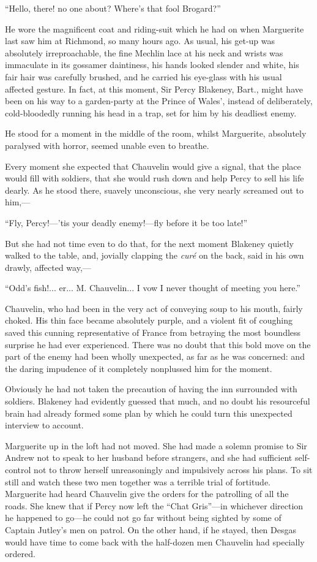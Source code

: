 \documentclass[paper=a5,BCOR=7mm,twoside,DIV=calc,12pt,usegeometry,chapterprefix,endperiod,headings=big]{scrbook}
\begin{document}
\enquote{Hello, there! no one about? Where's that fool Brogard?}

He wore the magnificent coat and riding-suit which he had on when Marguerite last saw him at Richmond, so many hours ago. As usual, his get-up was absolutely irreproachable, the fine Mechlin lace at his neck and wrists was immaculate in its gossamer daintiness, his hands looked slender and white, his fair hair was carefully brushed, and he carried his eye-glass with his usual affected gesture. In fact, at this moment, Sir Percy Blakeney, Bart., might have been on his way to a garden-party at the Prince of Wales’, instead of deliberately, cold-bloodedly running his head in a trap, set for him by his deadliest enemy.

He stood for a moment in the middle of the room, whilst Marguerite, absolutely paralysed with horror, seemed unable even to breathe.

Every moment she expected that Chauvelin would give a signal, that the place would fill with soldiers, that she would rush down and help Percy to sell his life dearly. As he stood there, suavely unconscious, she very nearly screamed out to him,---

\enquote{Fly, Percy!---’tis your deadly enemy!---fly before it be too late!}

But she had not time even to do that, for the next moment Blakeney quietly walked to the table, and, jovially clapping the \textit{curé} on the back, said in his own drawly, affected way,---

\enquote{Odd's fish!... er... M. Chauvelin... I vow I never thought of meeting you here.}

Chauvelin, who had been in the very act of conveying soup to his mouth, fairly choked. His thin face became absolutely purple, and a violent fit of coughing saved this cunning representative of France from betraying the most boundless surprise he had ever experienced. There was no doubt that this bold move on the part of the enemy had been wholly unexpected, as far as he was concerned: and the daring impudence of it completely nonplussed him for the moment.

Obviously he had not taken the precaution of having the inn surrounded with soldiers. Blakeney had evidently guessed that much, and no doubt his resourceful brain had already formed some plan by which he could turn this unexpected interview to account.

Marguerite up in the loft had not moved. She had made a solemn promise to Sir Andrew not to speak to her husband before strangers, and she had sufficient self-control not to throw herself unreasoningly and impulsively across his plans. To sit still and watch these two men together was a terrible trial of fortitude. Marguerite had heard Chauvelin give the orders for the patrolling of all the roads. She knew that if Percy now left the \enquote{Chat Gris}---in whichever direction he happened to go---he could not go far without being sighted by some of Captain Jutley's men on patrol. On the other hand, if he stayed, then Desgas would have time to come back with the half-dozen men Chauvelin had specially ordered.
\end{document}

